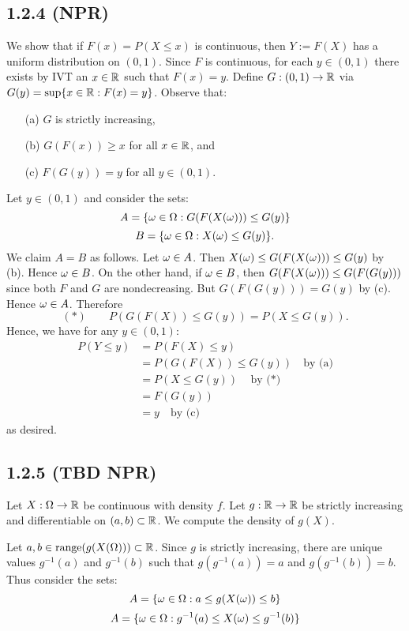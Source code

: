 \documentclass[11pt]{article}
\begin{document}
\subsection*{1.2.4 (NPR)}

We show that if $F(x) = P(X\leq x)$ is continuous, then $Y := F(X)$ has a uniform distribution on $(0,1)$. Since $F$ is continuous, for each $y \in (0,1)$ there exists by IVT an $x \in {\mathbb R}$ such that $F(x) = y$. Define $G:(0,1) \to {\mathbb R}$ via $G(y) = \sup \{x \in {\mathbb R} : F(x) = y\}$. Observe that: \begin{enumerate}
    \item[(a)] $G$ is strictly increasing, 
    \item[(b)] $G(F(x)) \geq x$ for all $x \in {\mathbb R}$, and 
    \item[(c)] $F(G(y)) = y$ for all $y \in (0,1)$. \end{enumerate}
    
    Let $y \in (0,1)$ and consider the sets: \[A = \{\omega \in \Omega : G(F(X(\omega))) \leq G(y)\}\]\[B = \{\omega \in \Omega : X(\omega) \leq G(y)\}.\] We claim $A = B$ as follows. Let $\omega \in A$. Then $X(\omega) \leq G(F(X(\omega))) \leq G(y)$ by (b). Hence $\omega \in B$. On the other hand, if $\omega \in B$, then $G(F(X(\omega))) \leq G(F(G(y)))$ since both $F$ and $G$ are nondecreasing. But $G(F(G(y))) = G(y)$ by (c). Hence $\omega \in A$. Therefore \[(*) \quad\quad P(G(F(X)) \leq G(y)) = P(X \leq G(y)). \] Hence, we have for any $y \in (0,1)$:\begin{align*}
    P(Y \leq y) &= P(F(X) \leq y)\\
    &= P(G(F(X)) \leq G(y)) \quad \text{by (a)} \\
    &= P(X \leq G(y))\quad \text{by ($*$)}\\
    &= F(G(y)) \\
    &= y \quad \text{by (c)}
\end{align*} as desired.

\subsection*{1.2.5 (TBD NPR)}

Let $X:\Omega \to {\mathbb R}$ be continuous with density $f$. Let $g:{\mathbb R} \to {\mathbb R}$ be strictly increasing and differentiable on $(a,b) \subset {\mathbb R}$. We compute the density of $g(X)$.

Let $a, b \in \text{range}(g(X(\Omega))) \subset {\mathbb R}$. Since $g$ is strictly increasing, there are unique values $g^{-1}(a)$ and $g^{-1}(b)$ such that $g(g^{-1}(a)) = a$ and $g(g^{-1}(b))=b$. Thus consider the sets: \[A = \{\omega \in \Omega : a \leq g(X(\omega))\leq  b\}\]\[A = \{\omega \in \Omega : g^{-1}(a) \leq X(\omega)\leq  g^{-1}(b)\}\]
\end{document}
